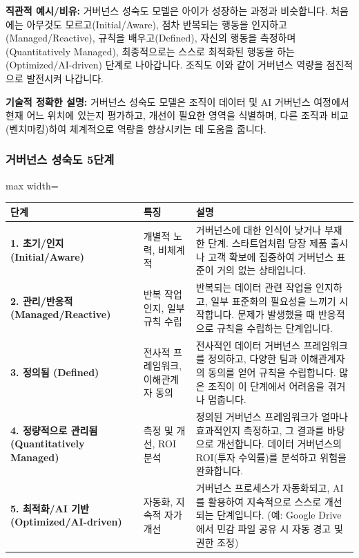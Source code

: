 \documentclass[11pt,a4paper]{article}
\theoremstyle{definition}
\begin{document}
\textbf{직관적 예시/비유:}
거버넌스 성숙도 모델은 아이가 성장하는 과정과 비슷합니다. 처음에는 아무것도 모르고(Initial/Aware), 점차 반복되는 행동을 인지하고(Managed/Reactive), 규칙을 배우고(Defined), 자신의 행동을 측정하며(Quantitatively Managed), 최종적으로는 스스로 최적화된 행동을 하는(Optimized/AI-driven) 단계로 나아갑니다. 조직도 이와 같이 거버넌스 역량을 점진적으로 발전시켜 나갑니다.

\textbf{기술적 정확한 설명:}
거버넌스 성숙도 모델은 조직이 데이터 및 AI 거버넌스 여정에서 현재 어느 위치에 있는지 평가하고, 개선이 필요한 영역을 식별하며, 다른 조직과 비교(벤치마킹)하여 체계적으로 역량을 향상시키는 데 도움을 줍니다.

\subsubsection*{거버넌스 성숙도 5단계}
\begin{adjustbox}{max width=\textwidth}
\begin{tabular}{p{}p{}p{}}
\toprule
\textbf{단계} & \textbf{특징} & \textbf{설명} \\
\midrule
\textbf{1. 초기/인지 (Initial/Aware)} & 개별적 노력, 비체계적 & 거버넌스에 대한 인식이 낮거나 부재한 단계. 스타트업처럼 당장 제품 출시나 고객 확보에 집중하여 거버넌스 표준이 거의 없는 상태입니다. \\
\textbf{2. 관리/반응적 (Managed/Reactive)} & 반복 작업 인지, 일부 규칙 수립 & 반복되는 데이터 관련 작업을 인지하고, 일부 표준화의 필요성을 느끼기 시작합니다. 문제가 발생했을 때 반응적으로 규칙을 수립하는 단계입니다. \\
\textbf{3. 정의됨 (Defined)} & 전사적 프레임워크, 이해관계자 동의 & 전사적인 데이터 거버넌스 프레임워크를 정의하고, 다양한 팀과 이해관계자의 동의를 얻어 규칙을 수립합니다. 많은 조직이 이 단계에서 어려움을 겪거나 멈춥니다. \\
\textbf{4. 정량적으로 관리됨 (Quantitatively Managed)} & 측정 및 개선, ROI 분석 & 정의된 거버넌스 프레임워크가 얼마나 효과적인지 측정하고, 그 결과를 바탕으로 개선합니다. 데이터 거버넌스의 ROI(투자 수익률)를 분석하고 위험을 완화합니다. \\
\textbf{5. 최적화/AI 기반 (Optimized/AI-driven)} & 자동화, 지속적 자가 개선 & 거버넌스 프로세스가 자동화되고, AI를 활용하여 지속적으로 스스로 개선되는 단계입니다. (예: Google Drive에서 민감 파일 공유 시 자동 경고 및 권한 조정) \\
\bottomrule
\end{tabular}
\end{adjustbox}
\label{tab:maturity_model}
\end{document}
